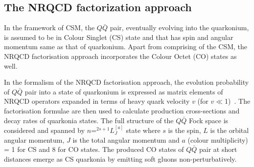 \subsection{The NRQCD factorization approach}


In the framework of CSM, the $Q\bar{Q}$ pair, eventually evolving into the quarkonium,
is assumed to be in Colour Singlet (CS) state and that has spin and 
angular momentum same as that of quarkonium.
Apart from comprising of the CSM, the NRQCD factorisation approach incorporates 
the Colour Octet (CO) states as well.

In the formalism of the NRQCD factorisation approach, the evolution probability of $Q\bar{Q}$
pair into a state of quarkonium is expressed as matrix elements of NRQCD operators expanded
in terms of heavy quark velocity $v$ (for $v\ll$1)~\cite{Bodwin:1994jh}.
The factorisation formulae are then used to calculate production cross-sections
and decay rates of quarkonia states.
The full structure of the $Q\bar{Q}$ Fock space
is considered and spanned by $n$=$^{2s+1}L_J^{[a]}$ state where $s$
is the spin, $L$ is the orbital angular momentum, $J$ is the total angular momentum
and $a$ (colour multiplicity) = 1 for CS and 8 for CO states. 
The produced CO states of $Q\bar{Q}$ pair at short distances emerge as 
CS quarkonia by emitting soft gluons non-perturbatively.

